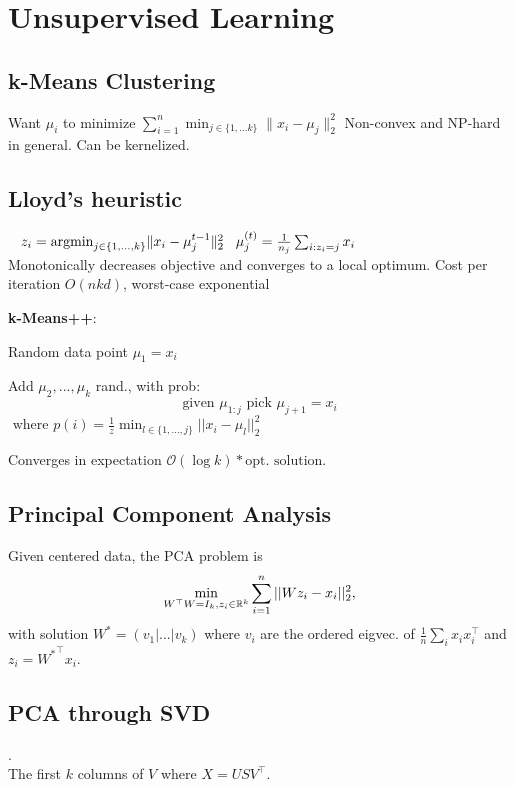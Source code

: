 \section*{Unsupervised Learning}

\subsection*{k-Means Clustering}

Want $\mu_i$ to minimize $\sum_{i=1}^n \min_{j\in\{1,...k\}}\|x_i-\mu_j\|_2^2$
Non-convex and NP-hard in general. Can be kernelized.

\subsection*{Lloyd's heuristic}
$\hspace*{3mm}z_i = \text{argmin}_{j\in\{1,...,k\}}\|x_i - \mu_j^{t-1}\|_2^2\\
\hspace*{3mm}\mu_j^{(t)} = \frac{1}{n_j}\sum_{i:z_i=j}x_i$\\
Monotonically decreases objective and converges to a local 
optimum. Cost per iteration $O(nkd)$, worst-case exponential

\textbf{k-Means++}: \begin{compactitem}
	\item Random data point $\mu_1 = x_i$
	\item Add $\mu_2,...,\mu_k$ rand., with prob:
		$$\text{given } \mu_{1:j} \text{ pick } \mu_{j+1} = x_i$$ 
		$\text{ where } p(i) = \frac{1}{z} \min_{l \in \{1,...,j\}} ||x_i - \mu_l||_2^2$
\end{compactitem}
Converges in expectation $\mathcal O (\log k) * \text{opt. solution}$.

\subsection*{Principal Component Analysis}

Given centered data, the PCA problem is 
$$\min_{W^\top W=I_k,z_i\in\mathbb{R}^k}\sum_{i=1}^n||W z_i - x_i||_2^2,$$
with solution $W^* = (v_1|...|v_k)$ where $v_i$ are the ordered 
eigvec. of $\frac{1}{n}\sum_ix_ix_i^\top$ 
and $z_i = {W^*}^\top x_i$. 

\subsection*{PCA through SVD}
\color{White} . \color {Black}\\[-10pt]
The first $k$ columns of $V$ where $X = U S V^\top$.

